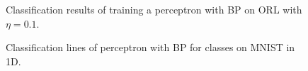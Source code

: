 \documentclass[journal]{IEEEtran}
\begin{document}
\begin{figure}[H]
	\centering
	\caption{Classification results of training a perceptron with BP on ORL with $\eta=0.1$.}
	\label{fig:orlperceptronbp}
\end{figure}

\begin{figure}
	\centering
	\caption{Classification lines of perceptron with BP for classes on MNIST in 1D.}
	\label{fig:mnistperceptronlinebp1dpca}
\end{figure}
\end{document}
